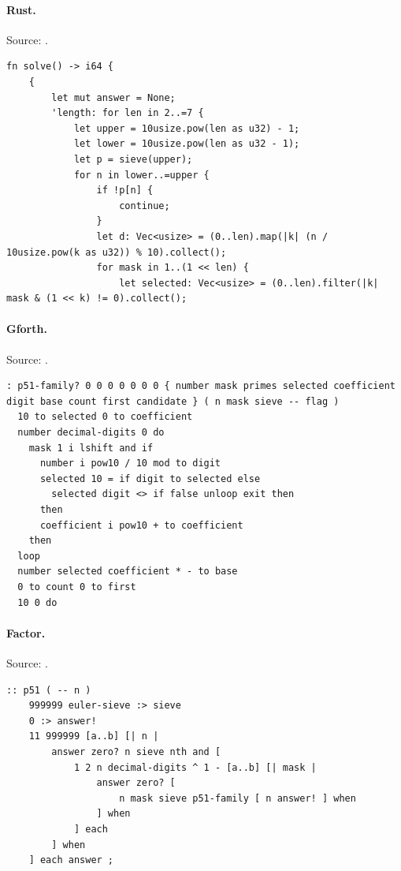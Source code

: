 \paragraph{Rust.} Source: .
\begin{lstlisting}
fn solve() -> i64 {
    {
        let mut answer = None;
        'length: for len in 2..=7 {
            let upper = 10usize.pow(len as u32) - 1;
            let lower = 10usize.pow(len as u32 - 1);
            let p = sieve(upper);
            for n in lower..=upper {
                if !p[n] {
                    continue;
                }
                let d: Vec<usize> = (0..len).map(|k| (n / 10usize.pow(k as u32)) % 10).collect();
                for mask in 1..(1 << len) {
                    let selected: Vec<usize> = (0..len).filter(|k| mask & (1 << k) != 0).collect();
\end{lstlisting}

\paragraph{Gforth.} Source: .
\begin{lstlisting}
: p51-family? 0 0 0 0 0 0 0 { number mask primes selected coefficient digit base count first candidate } ( n mask sieve -- flag )
  10 to selected 0 to coefficient
  number decimal-digits 0 do
    mask 1 i lshift and if
      number i pow10 / 10 mod to digit
      selected 10 = if digit to selected else
        selected digit <> if false unloop exit then
      then
      coefficient i pow10 + to coefficient
    then
  loop
  number selected coefficient * - to base
  0 to count 0 to first
  10 0 do
\end{lstlisting}

\paragraph{Factor.} Source: .
\begin{lstlisting}
:: p51 ( -- n )
    999999 euler-sieve :> sieve
    0 :> answer!
    11 999999 [a..b] [| n |
        answer zero? n sieve nth and [
            1 2 n decimal-digits ^ 1 - [a..b] [| mask |
                answer zero? [
                    n mask sieve p51-family [ n answer! ] when
                ] when
            ] each
        ] when
    ] each answer ;
\end{lstlisting}

